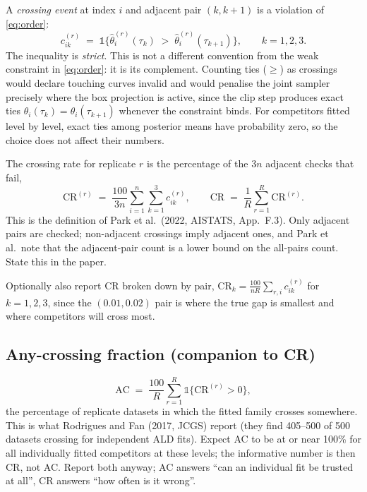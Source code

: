 \documentclass[11pt]{article}
\newcommand{\ind}{\mathbb{1}}
\begin{document}
A \emph{crossing event} at index $i$ and adjacent pair $(k,k+1)$ is a violation of \eqref{eq:order}:
\begin{equation}
c^{(r)}_{ik} \;=\; \ind\bigl\{\hat\theta^{(r)}_i(\tau_k) \;>\; \hat\theta^{(r)}_i(\tau_{k+1})\bigr\},\qquad k=1,2,3.
\label{eq:event}
\end{equation}
The inequality is \emph{strict}. This is not a different convention from the weak constraint in \eqref{eq:order}: it is its complement. Counting ties ($\ge$) as crossings would declare touching curves invalid and would penalise the joint sampler precisely where the box projection is active, since the clip step produces exact ties $\theta_i(\tau_k)=\theta_i(\tau_{k+1})$ whenever the constraint binds. For competitors fitted level by level, exact ties among posterior means have probability zero, so the choice does not affect their numbers.

The crossing rate for replicate $r$ is the percentage of the $3n$ adjacent checks that fail,
\begin{equation}
\mathrm{CR}^{(r)} \;=\; \frac{100}{3n}\sum_{i=1}^n\sum_{k=1}^{3} c^{(r)}_{ik},
\qquad
\mathrm{CR} \;=\; \frac1R\sum_{r=1}^R \mathrm{CR}^{(r)}.
\label{eq:cr}
\end{equation}
This is the definition of Park et al.\ (2022, AISTATS, App.~F.3). Only adjacent pairs are checked; non-adjacent crossings imply adjacent ones, and Park et al.\ note that the adjacent-pair count is a lower bound on the all-pairs count. State this in the paper.

Optionally also report CR broken down by pair, $\mathrm{CR}_k = \tfrac{100}{n R}\sum_{r,i} c^{(r)}_{ik}$ for $k=1,2,3$, since the $(0.01,0.02)$ pair is where the true gap is smallest and where competitors will cross most.

\subsection{Any-crossing fraction (companion to CR)}

\begin{equation}
\mathrm{AC} \;=\; \frac{100}{R}\sum_{r=1}^R \ind\bigl\{\mathrm{CR}^{(r)}>0\bigr\},
\label{eq:ac}
\end{equation}
the percentage of replicate datasets in which the fitted family crosses somewhere. This is what Rodrigues and Fan (2017, JCGS) report (they find 405--500 of 500 datasets crossing for independent ALD fits). Expect AC to be at or near 100\% for all individually fitted competitors at these levels; the informative number is then CR, not AC. Report both anyway; AC answers ``can an individual fit be trusted at all'', CR answers ``how often is it wrong''.
\end{document}
